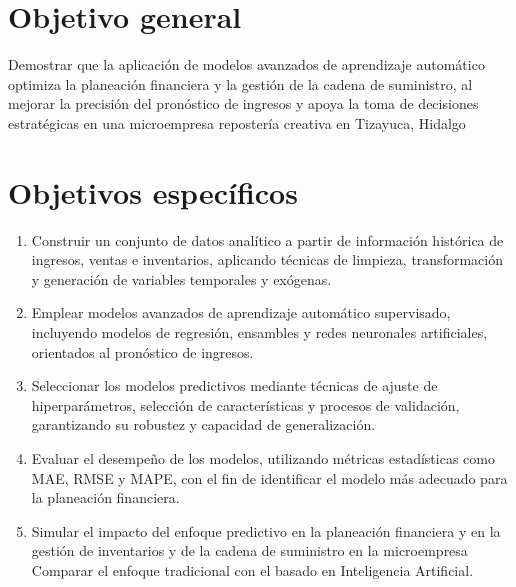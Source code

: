 \documentclass[12pt]{book}
\begin{document}
\section{Objetivo general}
Demostrar que la aplicación de modelos avanzados de aprendizaje automático optimiza la planeación financiera y la gestión de la cadena de suministro, al mejorar la precisión del pronóstico de ingresos y apoya la toma de decisiones estratégicas en una microempresa repostería creativa en Tizayuca, Hidalgo

\section{Objetivos específicos}
\begin{enumerate}
\item Construir un conjunto de datos analítico a partir de información histórica de ingresos, ventas e inventarios, aplicando técnicas de limpieza, transformación y generación de variables temporales y exógenas. 
\item Emplear modelos avanzados de aprendizaje automático supervisado, incluyendo modelos de regresión, ensambles y redes neuronales artificiales, orientados al pronóstico de ingresos. 
\item Seleccionar los modelos predictivos mediante técnicas de ajuste de hiperparámetros, selección de características y procesos de validación, garantizando su robustez y capacidad de generalización.
\item Evaluar el desempeño de los modelos, utilizando métricas estadísticas como MAE, RMSE y MAPE, con el fin de identificar el modelo más adecuado para la planeación financiera. 
\item Simular el impacto del enfoque predictivo en la planeación financiera y en la gestión de inventarios y de la cadena de suministro en la microempresa
Comparar el enfoque tradicional con el basado en Inteligencia Artificial.
\end{enumerate}
\end{document}
